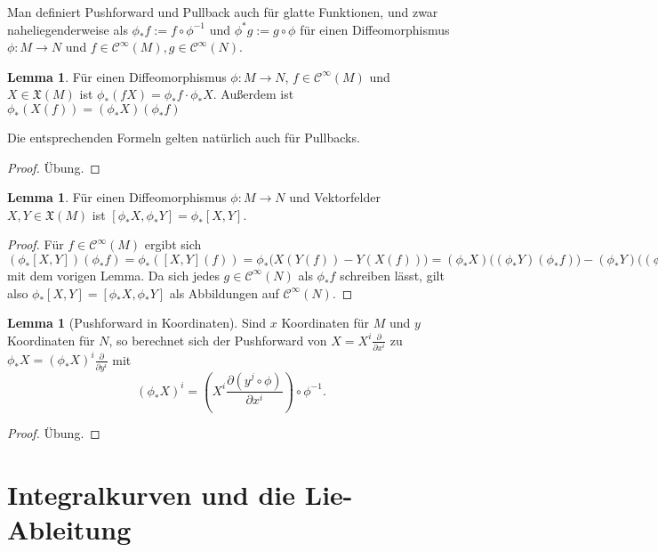 \documentclass[a4paper]{scrreprt}
\numberwithin{equation}{chapter}
\newcommand{\sC}{\mathcal{C}^{\infty}}
\theoremstyle{definition}
\newtheorem{lemma}[defn]{Lemma}
\newcommand{\bewUeb}{\begin{proof}Übung.\end{proof}}
\begin{document}
Man definiert Pushforward und Pullback auch für glatte Funktionen, und zwar naheliegenderweise als $\phi_*f := f \circ \phi^{-1}$ und $\phi^*g := g \circ \phi$ für einen Diffeomorphismus $\phi\colon M \to N$ und $f \in \sC(M), g \in \sC(N)$.

\begin{lemma} \label{lemma:transport_VF_funk}
	Für einen Diffeomorphismus $\phi\colon M \to N$, $f \in \sC(M)$ und $X \in \mathfrak X(M)$ ist $\phi_*(f X) = \phi_*f \cdot \phi_*X$. Außerdem ist $\phi_*(X(f)) = (\phi_*X)(\phi_*f)$

	Die entsprechenden Formeln gelten natürlich auch für Pullbacks.
	\bewUeb
\end{lemma}

\begin{lemma}
	Für einen Diffeomorphismus $\phi\colon M \to N$ und Vektorfelder $X, Y \in \mathfrak X(M)$ ist $[\phi_*X,\phi_*Y] = \phi_*[X,Y]$.

	\begin{proof}
		Für $f \in \sC(M)$ ergibt sich $(\phi_*[X,Y])(\phi_*f) = \phi_*([X,Y](f)) = \phi_*\Big(X(Y(f)) - Y(X(f))\Big) = (\phi_*X)\Big((\phi_*Y)(\phi_*f)\Big) - (\phi_*Y)\Big((\phi_*X)(\phi_*f)\Big) = [\phi_*X,\phi_*Y](\phi_*f)$ mit dem vorigen Lemma. Da sich jedes $g\in \sC(N)$ als $\phi_*f$ schreiben lässt, gilt also $\phi_*[X,Y] = [\phi_*X,\phi_*Y]$ als Abbildungen auf $\sC(N)$.
	\end{proof}
\end{lemma}

\begin{lemma}[Pushforward in Koordinaten]
	Sind $x$ Koordinaten für $M$ und $y$ Koordinaten für $N$, so berechnet sich der Pushforward von $X = X^i \frac{\partial}{\partial x^i}$ zu $\phi_*X = (\phi_*X)^i \frac{\partial}{\partial y^i}$ mit
	\[(\phi_*X)^i = \left(X^i \frac{\partial (y^j \circ \phi)}{\partial x^i}\right) \circ \phi^{-1}.\]
	\bewUeb
\end{lemma}

\section{Integralkurven und die Lie-Ableitung}
\end{document}
